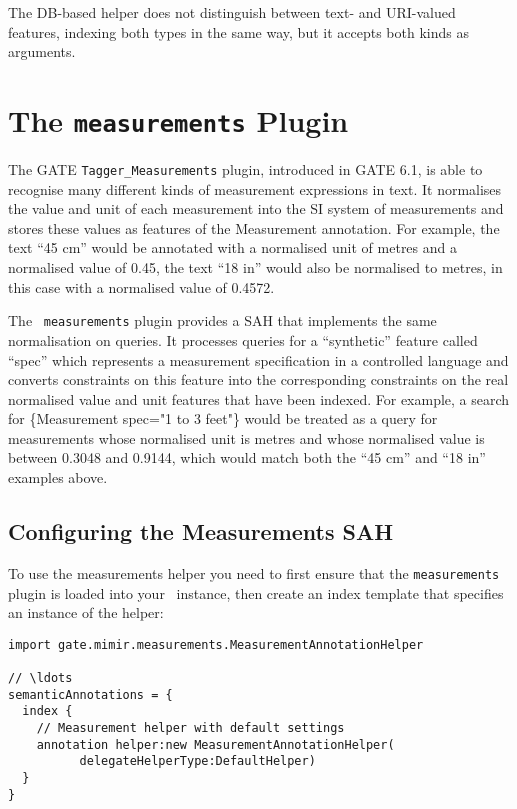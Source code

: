 The DB-based helper does not distinguish between text- and URI-valued features,
indexing both types in the same way, but it accepts both kinds as arguments.

\section{The {\tt measurements} Plugin}\label{sec:plugins:measurements}

The GATE {\tt Tagger\_Measurements} plugin, introduced in GATE 6.1, is able to
recognise many different kinds of measurement expressions in text.  It
normalises the value and unit of each measurement into the SI system of
measurements and stores these values as features of the Measurement annotation.
For example, the text ``45 cm'' would be annotated with a normalised unit of
metres and a normalised value of 0.45, the text ``18 in'' would also be
normalised to metres, in this case with a normalised value of 0.4572.

The \Mimir\ {\tt measurements} plugin provides a SAH that implements the same
normalisation on queries.  It processes queries for a ``synthetic'' feature
called ``spec'' which represents a measurement specification in a controlled
language and converts constraints on this feature into the corresponding
constraints on the real normalised value and unit features that have been
indexed.  For example, a search for \{Measurement spec="1 to 3 feet"\} would be
treated as a query for measurements whose normalised unit is metres and whose
normalised value is between 0.3048 and 0.9144, which would match both the ``45
cm'' and ``18 in'' examples above.

\subsection{Configuring the Measurements SAH}

To use the measurements helper you need to first ensure that the
{\tt measurements} plugin is loaded into your \Mimir\ instance, then create an
index template that specifies an instance of the helper:
\begin{lstlisting}[texcl]
import gate.mimir.measurements.MeasurementAnnotationHelper

// \ldots
semanticAnnotations = {
  index {
    // Measurement helper with default settings
    annotation helper:new MeasurementAnnotationHelper(
          delegateHelperType:DefaultHelper)
  }
}
\end{lstlisting}

